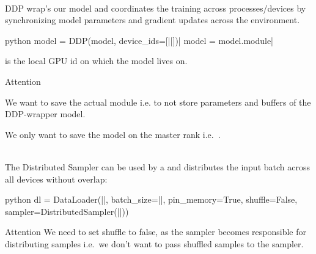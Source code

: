 \begin{defnbox}\nospacing
    \begin{defn}\label{defn:distributeddataparallel}\leavevmode\\
        DDP wrap's our model and coordinates the training across processes/devices by synchronizing model parameters and gradient updates across the environment.
        \begin{mintlinebox}{python}
            model = DDP(model, device_ids=[|\texttt{}|])|\hfill{} model = model.module|
        \end{mintlinebox}
    \end{defn}
\end{defnbox}
\begin{notebox}[Note]\nospacing
    \texttt{} is the local GPU id on which the model lives on.
\end{notebox}
\begin{attentionbox}{Attention}\nospacing
    \begin{itemizenosep}
        \item We want to save the actual module i.e.  to not store parameters and buffers of the DDP-wrapper model.
        \item We only want to save the model on the master rank i.e.\ .
    \end{itemizenosep}
\end{attentionbox}
\begin{defnbox}\nospacing
    \begin{defn}\label{defn:distributed_sampling}\leavevmode\\
        The Distributed Sampler can be used by a  and distributes the input batch across all devices without overlap:
        \begin{mintlinebox}{python}
            dl = DataLoader(|\texttt{}|, batch_size=|\texttt{}|, pin_memory=True,
                            shuffle=False,
                            sampler=DistributedSampler(|\texttt{}|))
        \end{mintlinebox}
    \end{defn}
\end{defnbox}
\begin{attentionbox}{Attention}\nospacing
    We need to set shuffle to false, as the sampler becomes responsible for distributing samples i.e.\ we don't want to pass shuffled
    samples to the sampler.
\end{attentionbox}




